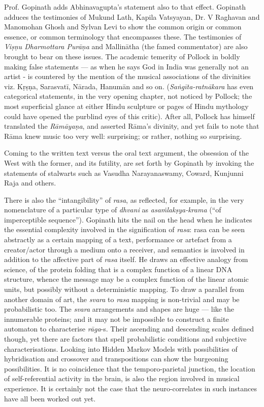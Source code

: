 Prof. Gopinath adds Abhinavagupta’s statement also to that effect. Gopinath adduces the testimonies of Mukund Lath, Kapila Vatsyayan, Dr. V Raghavan and Manomohan Ghosh and Sylvan Levi to show the common origin or common essence, or common terminology that encompasses these. The testimonies of \textsl{Viṣṇu Dharmottara Purāṇa} and Mallinātha (the famed commentator) are also brought to bear on these issues. The academic temerity of Pollock in boldly making false statements --- as when he says God in India was generally not an artist - is countered by the mention of the musical associations of the divinities viz. Kṛṣṇa, Sarasvatī, Nārada, Hanumān and so on. (\textsl{Saṅgīta-ratnākara} has even categorical statements, in the very opening chapter, not noticed by Pollock; the most superficial glance at either Hindu sculpture or pages of Hindu mythology could have opened the purblind eyes of this critic). After all, Pollock has himself translated the \textsl{Rāmāyaṇa}, and asserted Rāma’s divinity, and yet fails to note that Rāma knew music too very well: surprising; or rather, nothing so surprising.

Coming to the written text versus the oral text argument, the obsession of the West with the former, and its futility, are set forth by Gopinath by invoking the statements of stalwarts such as Vasudha Narayanaswamy, Coward, Kunjunni Raja and others.

There is also the “intangibility” of \textsl{rasa}, as reflected, for example, in the very nomenclature of a particular type of \textsl{dhvani} as \textsl{asaṁlakṣya-krama} (“of imperceptible sequence”). Gopinath hits the nail on the head when he indicates the essential complexity involved in the signification of \textsl{rasa}: rasa can be seen abstractly as a certain mapping of a text, performance or artefact from a creator/actor through a medium onto a receiver, and semantics is involved in addition to the affective part of \textsl{rasa} itself. He draws an effective analogy from science, of the protein folding that is a complex function of a linear DNA structure, whence the message may be a complex function of the linear atomic units, but possibly without a deterministic mapping. To draw a parallel from another domain of art, the \textsl{svara} to \textsl{rasa} mapping is non-trivial and may be probabilistic too. The \textsl{svara} arrangements and shapes are huge --- like the innumerable proteins; and it may not be impossible to construct a finite automaton to characterise \textsl{rāga}-s. Their ascending and descending scales defined though, yet there are factors that spell probabilistic conditions and subjective characterisations. Looking into Hidden Markov Models with possibilities of hybridisation and crossover and transpositions can show the burgeoning possibilities. It is no coincidence that the temporo-parietal junction, the location of self-referential activity in the brain, is also the region involved in musical experience. It is certainly not the case that the neuro-correlates in such instances have all been worked out yet.

